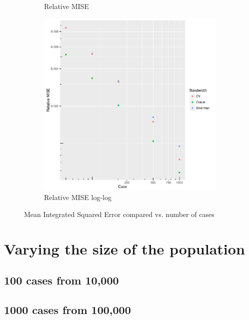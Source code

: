\begin{figure}[htb]
\begin{subfigure}[b]{0.3\textwidth}
    \caption{Relative MISE}
    \end{subfigure}
    \begin{subfigure}[b]{0.3\textwidth}
    \includegraphics[width=\textwidth]{results/by_num_cases/RMISE-vs-cases-log-log}
    \caption{Relative MISE log-log}
    \end{subfigure}
    \caption[MISE: by number of cases]{Mean Integrated Squared Error compared vs. number of cases}
    \label{fig:ise:unif_100_unif}
\end{figure}

\section{Varying the size of the population}
\label{sec:results:unifNpop_100_1h}

\subsection{100 cases from 10,000}


\subsection{1000 cases from 100,000}


